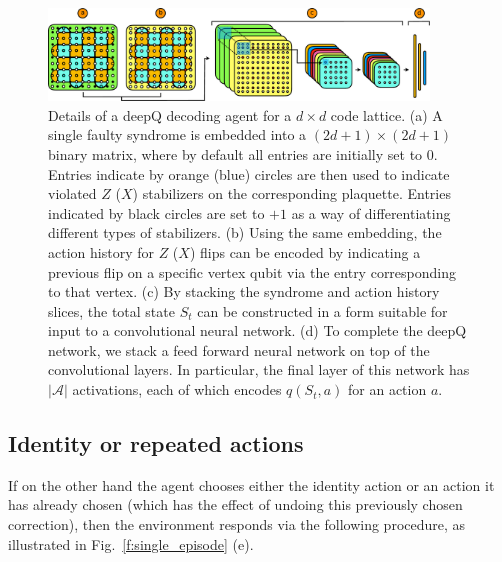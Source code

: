 \documentclass[twocolumn,preprintnumbers,amsmath,amssymb,notitlepage,nofootinbib,longbibliography,superscriptaddress,aps,pra,10pt]{revtex4-1}
\begin{document}
	\begin{figure}
		\centering
		\includegraphics[width=0.9\textwidth]{figures/agent.pdf}
		\caption{
			Details of a deepQ decoding agent for a $d\times d$ code lattice.
			(a) A single faulty syndrome is embedded into a $(2d +1)\times(2d+1)$ binary matrix, where by default all entries are initially set to $0$.
			Entries indicate by orange (blue) circles are then used to indicate violated $Z$ ($X$) stabilizers on the corresponding plaquette.
			Entries indicated by black circles are set to $+1$ as a way of differentiating different types of stabilizers.
			(b) Using the same embedding, the action history for $Z$ ($X$) flips can be encoded by indicating a previous flip on a specific vertex qubit via the entry corresponding to that vertex.
			(c) By stacking the syndrome and action history slices, the total state $S_t$ can be constructed in a form suitable for input to a convolutional neural network.
			(d) To complete the deepQ network, we stack a feed forward neural network on top of the convolutional layers.
			In particular, the final layer of this network has $|\mathcal{A}|$ activations, each of which encodes $q(S_t,a)$ for an action $a$.
		}
		\label{f:agent}
	\end{figure}

	\subsection{Identity or repeated actions}
	If on the other hand the agent chooses either the identity action or an action it has already chosen (which has the effect of undoing this previously chosen correction),
	then the environment responds via the following procedure, as illustrated in Fig.~\ref{f:single_episode} (e).
\end{document}
